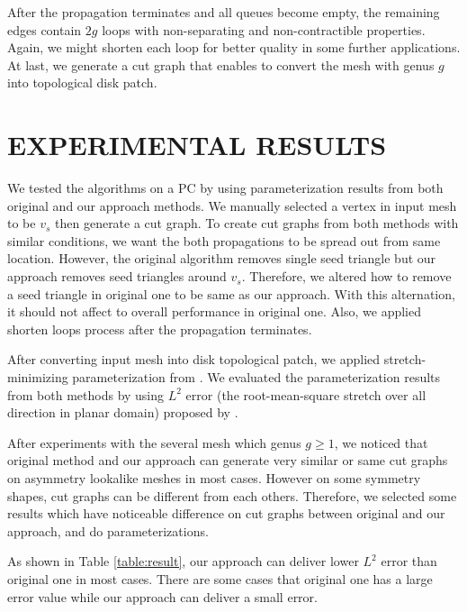 \documentclass[a4paper,twoside]{article}
\begin{document}
After the propagation terminates and all queues become empty, the remaining edges contain $2g$ loops with non-separating and non-contractible properties. Again, we might shorten each loop for better quality in some further applications. At last, we generate a cut graph that enables to convert the mesh with genus $g$ into topological disk patch.


\section{\uppercase{Experimental Results}}
\label{sec:Experiment Results}
\noindent We tested the algorithms on a PC by using parameterization results from both original and our approach methods. We manually selected a vertex in input mesh to be $v_s$ then generate a cut graph. To create cut graphs from both methods with similar conditions, we want the both propagations to be spread out from same location. However, the original algorithm removes single seed triangle but our approach removes seed triangles around $v_s$. Therefore, we altered how to remove a seed triangle in original one to be same as our approach. With this alternation, it should not affect to overall performance in original one. Also, we applied shorten loops process after the propagation terminates.

After converting input mesh into disk topological patch, we applied stretch-minimizing parameterization from \cite{Yoshizawa_SMI04}.  We evaluated the parameterization results from both methods by using $L^2$ error (the root-mean-square stretch over all direction in planar domain) proposed by \cite{Sander:2001:TMP:383259.383307,Sander:2002:SP:581896.581909}.  

After experiments with the several mesh which genus $g \geq 1$, we noticed that original method and our approach can generate very similar or same cut graphs on asymmetry lookalike meshes in most cases. However on some symmetry shapes, cut graphs can be different from each others. Therefore, we selected some results which have noticeable difference on cut graphs between original and our approach, and do parameterizations.

As shown in Table \ref{table:result}, our approach can deliver lower  $L^2$ error than original one in most cases. There are some cases that original one has a large error value while our approach can deliver a small error.
\end{document}
